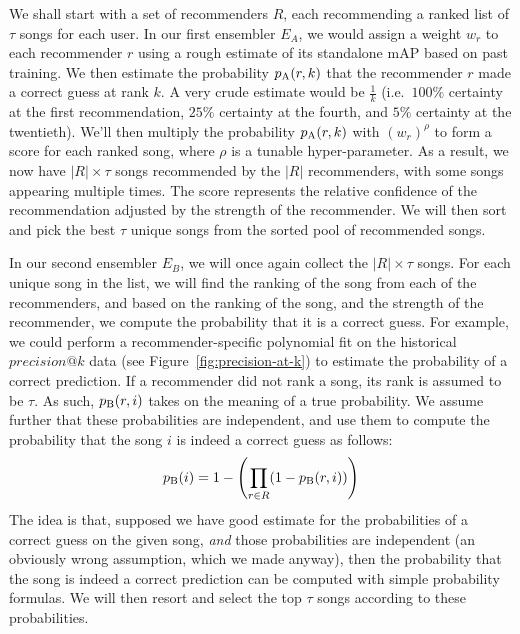 \documentclass[conference]{IEEEtran}
\newcommand{\mAP}{m\textsc{AP} }
\begin{document}
We shall start with a set of recommenders $R$,
each recommending a ranked list of $\tau$
songs for each user.
In our first ensembler $E_A$,
we would assign a weight $w_r$ to each recommender
$r$ using a rough estimate of its standalone \mAP based on
past training. We then estimate the probability $p_{\rm A}(r, k)$ that the recommender
$r$ made a correct guess at rank $k$. A very crude estimate would be
$\frac{1}{k}$ (i.e.~$100\%$ certainty at the first recommendation,
$25\%$ certainty at the fourth, and $5\%$ certainty at the twentieth). We'll
then multiply the probability $p_{\rm A}(r,k)$ with $\left(w_r\right)^\rho$ to
form a score for each ranked song, where
$\rho$ is a tunable hyper-parameter. As a result, we now have
$|R| \times \tau$ songs recommended by the $|R|$ recommenders,
with some songs appearing multiple times. The score represents
the relative confidence of the recommendation adjusted by the strength of
the recommender. We will then sort and pick the best $\tau$ unique songs
from the sorted pool of recommended songs.

In our second ensembler $E_B$,
we will once again collect the $|R|\times \tau$ songs.
For each unique song in the list, we will find the ranking of the song
from each of the recommenders, and based on the ranking of the song, and the
strength of the recommender, we compute the probability that it is a correct
guess. For example, we could perform a recommender-specific
polynomial fit on the historical
$precision\textrm{@}k$ data (see Figure~\ref{fig:precision-at-k}) to estimate the probability of a correct prediction.
If a recommender did not rank a song, its rank is assumed
to be $\tau$. As such, $p_{\rm B}(r,i)$
takes on the meaning of a true probability. We assume further that these
probabilities are independent, and use them to compute the probability that
the song $i$ is indeed a correct guess as follows:
\begin{eqnarray*}
p_{\rm B}(i) = 1 - \left(\prod_{r \in R} (1-p_{\rm B}(r,i))\right)
\end{eqnarray*}
The idea is that, supposed we have good estimate for the probabilities of
a correct guess on the given song, {\em and} those probabilities are
independent (an obviously wrong assumption, which we made anyway), then
the probability that the song is indeed a correct prediction can be
computed with simple probability formulas.
We will then resort and select the top $\tau$ songs according to these
probabilities.
\end{document}
